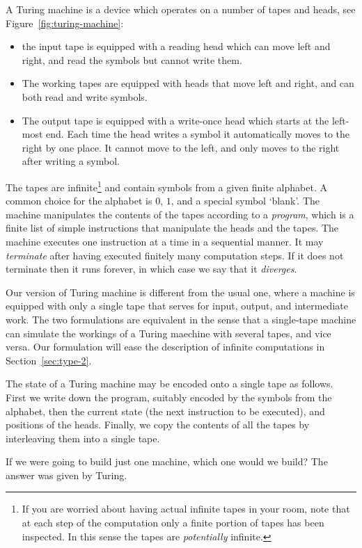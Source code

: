 A Turing machine is a device which operates on a number of tapes and
heads, see Figure~\ref{fig:turing-machine}:
%
\begin{itemize}
\item the input tape is equipped with a reading head which can move
  left and right, and read the symbols but cannot write them.
\item The working tapes are equipped with heads that move left and
  right, and can both read and write symbols.
\item The output tape is equipped with a write-once head which starts
  at the left-most end. Each time the head writes a symbol it
  automatically moves to the right by one place. It cannot move to the
  left, and only moves to the right after writing a symbol.
\end{itemize}
%
The tapes are infinite\footnote{If you are worried about having actual
  infinite tapes in your room, note that at each step of the
  computation only a finite portion of tapes has been inspected. In
  this sense the tapes are \emph{potentially} infinite.} and contain
symbols from a given finite alphabet. A common choice for the alphabet
is $0$, $1$, and a special symbol `blank'. The machine manipulates the
contents of the tapes according to a \emph{program}, which is a finite
list of simple instructions that manipulate the heads and the tapes.
The machine executes one instruction at a time in a sequential manner.
It may \emph{terminate} after having executed finitely many
computation steps. If it does not terminate then it runs forever, in
which case we say that it \emph{diverges}.

Our version of Turing machine is different from the usual one, where a
machine is equipped with only a single tape that serves for input,
output, and intermediate work. The two formulations are equivalent in
the sense that a single-tape machine can simulate the workings of a
Turing maechine with several tapes, and vice versa. Our formulation
will ease the description of infinite computations in
Section~\ref{sec:type-2}.

The state of a Turing machine may be encoded onto a single tape as
follows. First we write down the program, suitably encoded by the
symbols from the alphabet, then the current state (the next
instruction to be executed), and positions of the heads. Finally, we
copy the contents of all the tapes by interleaving them into a single
tape.

If we were going to build just one machine, which one would we build?
The answer was given by Turing.

